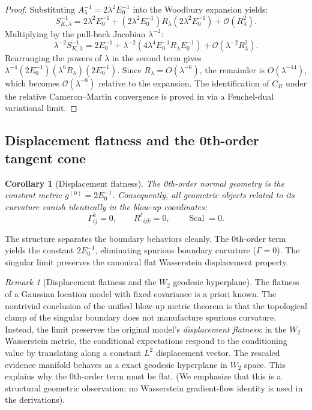 \documentclass[11pt]{amsart}
\theoremstyle{plain}
\newtheorem{corollary}[theorem]{Corollary}
\theoremstyle{definition}
\theoremstyle{remark}
\newtheorem{remark}[theorem]{Remark}
\begin{document}
\begin{proof}
Substituting $A_\lambda^{-1} = 2\lambda^2 E_0^{-1}$ into the Woodbury expansion yields:
\begin{equation}
  S_{K,\lambda}^{-1} = 2\lambda^2 E_0^{-1} + (2\lambda^2 E_0^{-1}) R_\lambda (2\lambda^2 E_0^{-1}) + \mathcal{O}(R_\lambda^2).
\end{equation}
Multiplying by the pull-back Jacobian $\lambda^{-2}$:
\begin{equation}
  \lambda^{-2} S_{K,\lambda}^{-1} = 2E_0^{-1} + \lambda^{-2}(4\lambda^4 E_0^{-1} R_\lambda E_0^{-1}) + \mathcal{O}(\lambda^{-2} R_\lambda^2).
\end{equation}
Rearranging the powers of $\lambda$ in the second term gives $\lambda^{-4} (2E_0^{-1})(\lambda^6 R_\lambda)(2E_0^{-1})$. Since $R_\lambda = O(\lambda^{-6})$, the remainder is $O(\lambda^{-14})$, which becomes $\mathcal{O}(\lambda^{-8})$ relative to the expansion. The identification of $C_R$ under the relative Cameron--Martin convergence is proved in  via a Fenchel-dual variational limit.
\end{proof}

\subsection{Displacement flatness and the 0th-order tangent cone}

\begin{corollary}[Displacement flatness]
\label{cor:displacement_flatness}
The 0th-order normal geometry is the constant metric $g^{(0)} = 2E_0^{-1}$. Consequently, all geometric objects related to its curvature vanish identically in the blow-up coordinates:
\begin{equation}
  \Gamma^k_{ij}=0,\qquad
  R^\ell{}_{ijk}=0,\qquad
  \operatorname{Scal}=0.
\end{equation}
\end{corollary}

The structure separates the boundary behaviors cleanly. The 0th-order term yields the constant $2E_0^{-1}$, eliminating spurious boundary curvature ($\Gamma = 0$). The singular limit preserves the canonical flat Wasserstein displacement property.

\begin{remark}[Displacement flatness and the $W_2$ geodesic hyperplane]
\label{rem:w2_hyperplane}
The flatness of a Gaussian location model with fixed covariance is a priori known. The nontrivial conclusion of the unified blow-up metric theorem is that the topological clamp of the singular boundary does not manufacture spurious curvature. Instead, the limit preserves the original model's \emph{displacement flatness}: in the $W_2$ Wasserstein metric, the conditional expectations respond to the conditioning value by translating along a constant $L^2$ displacement vector. The rescaled evidence manifold behaves as a exact geodesic hyperplane in $W_2$ space. This explains why the 0th-order term must be flat. (We emphasize that this is a structural geometric observation; no Wasserstein gradient-flow identity is used in the derivations).
\end{remark}
\end{document}
